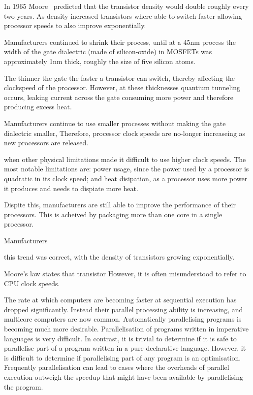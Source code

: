 %
%

In 1965 Moore~\cite{moore} predicted that the transistor 
density would double roughly every two years.
As density increased transistors where able to switch faster allowing
processor speeds to also improve exponentially.

Manufacturers continued to shrink their process,
until at a 45nm process the width of the gate dialectric
(made of silicon-oxide)
in MOSFETs was approximately 1nm thick,
roughly the size of five silicon atoms.

The thinner the gate the faster a transistor can switch,
thereby affecting the clockspeed of the processor.
However, at these thicknesses quantium tunneling occurs, leaking current across
the gate consuming more power and therefore producing excess heat.

Manufacturers continue to use smaller processes without making the gate
dialectric smaller,
Therefore, processor clock speeds are no-longer increaseing as new processors
are released.


when other physical limitations
made it difficult to use higher clock speeds.
The most notable limitations are:
power usage, since the power used by a processor is quadratic in its clock speed;
and heat disipation, as a processor uses more power it produces and needs to
dispiate more heat.

Dispite this, manufacturers are still able to improve the performance of their
processors.
This is acheived by packaging more than one core in a single processor.


Manufacturers 

this trend was correct, with the density of transistors
growing exponentially\cite{free_lunch_is_over}.

Moore's law\cite{moore} states that transistor
However, it is often misunderstood to refer to CPU clock speeds.


The rate at which computers are becoming faster at sequential
execution has dropped significantly.  Instead their parallel processing 
ability is increasing, and multicore computers are now common.
Automatically parallelising programs is becoming much more desirable.
Parallelisation of programs written in imperative languages is very
difficult.  In contrast, it is trivial to determine if it is safe to
parallelise part of a program written in a pure declarative language.
However, it is difficult to determine if parallelising part of any
program is an optimisation.  Frequently parallelisation can lead to
cases where the overheads of parallel execution outweigh the speedup
that might have been available by parallelising the program.

